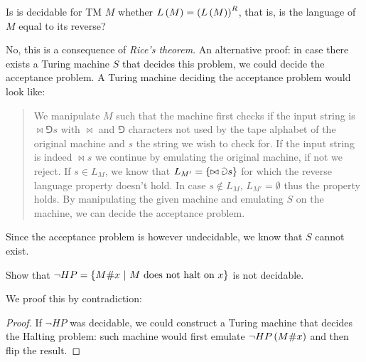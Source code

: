 \documentclass{article}
\begin{document}
\begin{exercise}
Is is decidable for TM $M$ whether $L\left( M \right)=\left( L\left( M \right) \right)^R$, that is, is the language of $M$ equal to its reverse?
\begin{answer}
No, this is a consequence of \emph{Rice's theorem}. An alternative proof: in case there exists a Turing machine $S$ that decides this problem, we could decide the acceptance problem. A Turing machine deciding the acceptance problem would look like:
\begin{quote}
We manipulate $M$ such that the machine first checks if the input string is $\bowtie\Game s$ with $\bowtie$ and $\Game$ characters not used by the tape alphabet of the original machine and $s$ the string we wish to check for. If the input string is indeed $\bowtie s$ we continue by emulating the original machine, if not we reject. If $s\in L_M$, we know that $L_{M'}=\left\{ \bowtie\Game s \right\}$ for which the reverse language property doesn't hold. In case $s\notin L_M$, $L_{M'}=\emptyset$ thus the property holds. By manipulating the given machine and emulating $S$ on the machine, we can decide the acceptance problem.
\end{quote}
Since the acceptance problem is however undecidable, we know that $S$ cannot exist.
\end{answer}
\end{exercise}

\begin{exercise}
Show that $\neg HP=\left\{ M \#x\ |\ \mbox{$M$ does not halt on $x$} \right\}$ is not decidable.
\begin{answer}
We proof this by contradiction:
\begin{proof}
If $\neg HP$ was decidable, we could construct a Turing machine that decides the Halting problem: such machine would first emulate $\neg HP\left( M\#x \right)$ and then flip the result.
\end{proof}
\end{answer}
\end{exercise}
\end{document}
